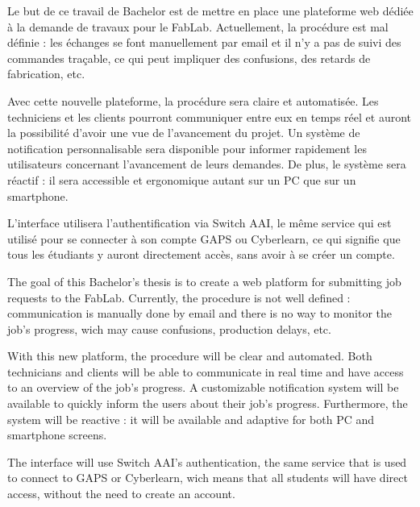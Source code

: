 Le but de ce travail de Bachelor est de mettre en place une plateforme web dédiée à la demande de travaux pour le FabLab.
Actuellement, la procédure est mal définie : les échanges se font manuellement par email et il n'y a pas de suivi des commandes traçable, ce qui peut impliquer des confusions, des retards de fabrication, etc.

Avec cette nouvelle plateforme, la procédure sera claire et automatisée.
Les techniciens et les clients pourront communiquer entre eux en temps réel et auront la possibilité d'avoir une vue de l'avancement du projet.
Un système de notification personnalisable sera disponible pour informer rapidement les utilisateurs concernant l'avancement de leurs demandes.
De plus, le système sera réactif : il sera accessible et ergonomique autant sur un PC que sur un smartphone.

L'interface utilisera l'authentification via Switch AAI, le même service qui est utilisé pour se connecter à son compte GAPS ou Cyberlearn, ce qui signifie que tous les étudiants y auront directement accès, sans avoir à se créer un compte.

\asterism

The goal of this Bachelor's thesis is to create a web platform for submitting job requests to the FabLab.
Currently, the procedure is not well defined : communication is manually done by email and there is no way to monitor the job's progress, wich may cause confusions, production delays, etc.

With this new platform, the procedure will be clear and automated.
Both technicians and clients will be able to communicate in real time and have access to an overview of the job's progress.
A customizable notification system will be available to quickly inform the users about their job's progress.
Furthermore, the system will be reactive : it will be available and adaptive for both PC and smartphone screens.

The interface will use Switch AAI's authentication, the same service that is used to connect to GAPS or Cyberlearn, wich means that all students will have direct access, without the need to create an account.